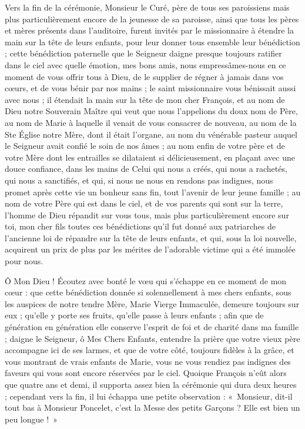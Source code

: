 \documentclass[11pt,a4paper]{report}
\begin{document}
Vers la fin de la cérémonie, Monsieur le Curé, père de tous ses paroissiens mais plus particulièrement encore de la jeunesse de sa paroisse, ainsi que tous les pères et mères présents dans l'auditoire, furent invités par le missionnaire à étendre la main sur la tête de leurs enfants, pour leur donner tous ensemble leur bénédiction ; cette bénédiction paternelle que le Seigneur daigne presque toujours ratifier dans le ciel avec quelle émotion, mes bons amis, nous empressâmes-nous en ce moment de vous offrir tous à Dieu, de le supplier de régner à jamais dans vos cœurs, et de vous bénir par nos mains ; le saint missionnaire vous bénissait aussi avec nous ; il étendait la main sur la tête de mon cher François, et au nom de Dieu notre Souverain Maître qui veut que nous l'appelions du doux nom de Père, au nom de Marie à laquelle il venait de vous consacrer de nouveau, au nom de la Ste Église notre Mère, dont il était l'organe, au nom du vénérable pasteur auquel le Seigneur avait confié le soin de nos âmes ; au nom enfin de votre père et de votre Mère dont les entrailles se dilataient si délicieusement, en plaçant avec une douce confiance, dans les mains de Celui qui nous a créés, qui nous a rachetés, qui nous a sanctifiés, et qui, si nous ne nous en rendons pas indignes, nous promet après cette vie un bonheur sans fin, tout l'avenir de leur jeune famille ; au nom de votre Père qui est dans le ciel, et de vos parents qui sont sur la terre, l'homme de Dieu répandit sur vous tous, mais plus particulièrement encore sur toi, mon cher fils toutes ces bénédictions qu'il fut donné aux patriarches de l'ancienne loi de répandre sur la tête de leurs enfants, et qui, sous la loi nouvelle, acquirent un prix de plus par les mérites de l'adorable victime qui a été immolée pour nous.

Ô Mon Dieu ! Écoutez avec bonté le vœu qui s'échappe en ce moment de mon cœur : que cette bénédiction donnée si solennellement à mes chers enfants, sous les auspices de notre tendre Mère, Marie Vierge Immaculée, demeure toujours sur eux ; qu'elle y porte ses fruits, qu'elle passe à leurs enfants ; afin que de génération en génération elle conserve l'esprit de foi et de charité dans ma famille ; daigne le Seigneur, ô Mes Chers Enfants, entendre la prière que votre vieux père accompagne ici de ses larmes, et que de votre côté, toujours fidèles à la grâce, et vous montrant de vrais enfants de Marie, vous ne vous rendiez pas indignes des faveurs qui vous sont encore réservées par le ciel. Quoique François n'eût alors que quatre ans et demi, il supporta assez bien la cérémonie qui dura deux heures ; cependant vers la fin, il lui échappa une petite observation : «~Monsieur, dit-il tout bas à Monsieur Poncelet, c'est la Messe des petits Garçons ? Elle est bien un peu longue !~»
\end{document}
